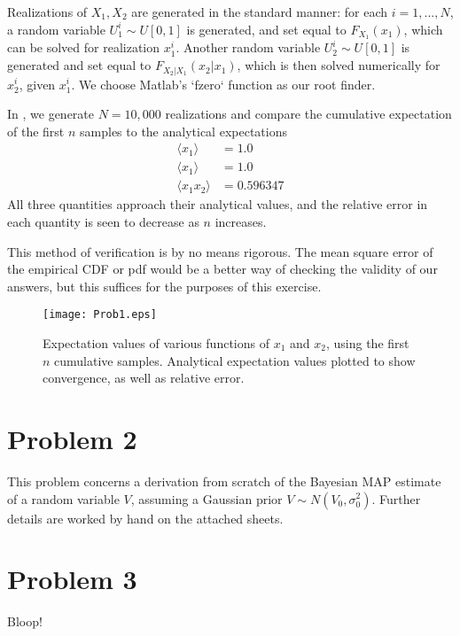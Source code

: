 \documentclass[11pt]{article}
\begin{document}
Realizations of $X_1,X_2$ are generated in the standard manner: for each $i = 1, ..., N$, a random variable $U_1^i \sim U[0,1]$ is generated, and set equal to $F_{X_1}(x_1)$, which can be solved for realization $x_1^i$. Another random variable $U_2^i \sim U[0,1]$ is generated and set equal to $F_{X_2|X_1}(x_2|x_1)$, which is then solved numerically for $x_2^i$, given $x_1^i$. We choose Matlab's `fzero` function as our root finder.

In , we generate $N=10,\!000$ realizations and compare the cumulative expectation of the first $n$ samples to the analytical expectations
\begin{equation}
\begin{aligned}
\langle x_1 \rangle &= 1.0 \\
\langle x_1 \rangle &= 1.0 \\
\langle x_1 x_2 \rangle &= 0.596347
\end{aligned}
\end{equation}
All three quantities approach their analytical values, and the relative error in each quantity is seen to decrease as $n$ increases.

This method of verification is by no means rigorous. The mean square error of the empirical CDF or pdf would be a better way of checking the validity of our answers, but this suffices for the purposes of this exercise.

\begin{figure}[t]
\centering
\texttt{[image: Prob1.eps]}
\caption{Expectation values of various functions of $x_1$ and $x_2$, using the first $n$ cumulative samples. Analytical expectation values plotted to show convergence, as well as relative error.}
\label{fig:prob1}
\end{figure}

\section*{Problem 2} %

This problem concerns a derivation from scratch of the Bayesian MAP estimate of a random variable $V$, assuming a Gaussian prior $V \sim N(V_0, \sigma_0^2)$. Further details are worked by hand on the attached sheets.

\section*{Problem 3} %

Bloop!

\end{document}
